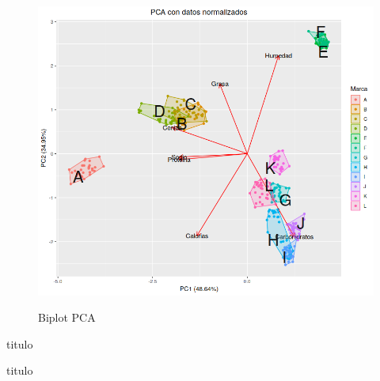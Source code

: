 \documentclass[pdf]{beamer}
\begin{document}
\begin{frame}
\begin{figure}[h]
\centering
	\includegraphics[scale=.35]{images/biplotPCA.png} 
	\label{i_biplot_PCA}
	\caption{Biplot PCA}
\end{figure}

\end{frame}

\begin{frame}{titulo}
\end{frame}

\begin{frame}{titulo}
\end{frame}
\end{document}
